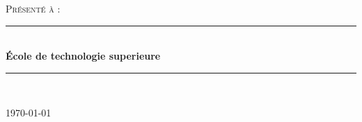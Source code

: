 %
%
%

\newcommand{\HRule}{\rule{\linewidth}{0.5mm}}

\begin{titlepage}
	\begin{center}
		\vspace{5cm}
		\textsc{\textbf{\Huge \ETScourse}}
		\vspace{2cm}

		\textsc{\Large \ETStitle }
		\vspace{2.5cm}

		\textsc{\Large Pr\'esent\'e \`a : \\
		\ETSprof}
		\vspace{1.5cm}

		\vfill
		\begin{minipage}{0.4\textwidth}
			\begin{flushleft}
				\large\ETSauthA
			\end{flushleft}
		\end{minipage}
		\begin{minipage}{0.4\textwidth}
			\begin{flushright}
				\large\ETSauthB
			\end{flushright}
		\end{minipage}
		\begin{minipage}{0.4\textwidth}
			\begin{center}
				\large \ETSauthC
			\end{center}
		\end{minipage}

		\vspace{2cm}
		\HRule \\[0.4cm]
		{ \huge \bfseries \'Ecole de technologie superieure \\[0.4cm] }
		\HRule \\[1.5cm]
		\vspace{1.5cm}

		{\large \today}
	\end{center}
\end{titlepage}
